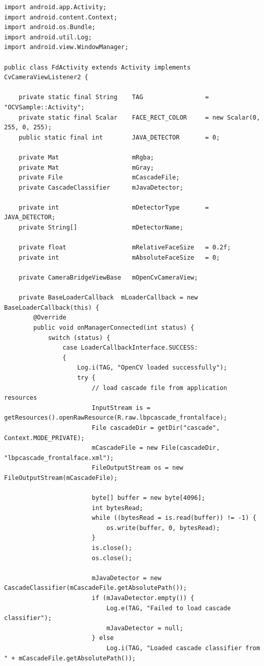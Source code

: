 \documentclass[11pt,a4paper,twoside]{report}
\begin{document}
\begin{appendix}
\begin{tiny}
\begin{flushleft}
\begin{lstlisting}
import android.app.Activity;
import android.content.Context;
import android.os.Bundle;
import android.util.Log;
import android.view.WindowManager;

public class FdActivity extends Activity implements CvCameraViewListener2 {

    private static final String    TAG                 = "OCVSample::Activity";
    private static final Scalar    FACE_RECT_COLOR     = new Scalar(0, 255, 0, 255);
    public static final int        JAVA_DETECTOR       = 0;

    private Mat                    mRgba;
    private Mat                    mGray;
    private File                   mCascadeFile;
    private CascadeClassifier      mJavaDetector;

    private int                    mDetectorType       = JAVA_DETECTOR;
    private String[]               mDetectorName;

    private float                  mRelativeFaceSize   = 0.2f;
    private int                    mAbsoluteFaceSize   = 0;

    private CameraBridgeViewBase   mOpenCvCameraView;

    private BaseLoaderCallback  mLoaderCallback = new BaseLoaderCallback(this) {
        @Override
        public void onManagerConnected(int status) {
            switch (status) {
                case LoaderCallbackInterface.SUCCESS:
                {
                    Log.i(TAG, "OpenCV loaded successfully");
                    try {
                        // load cascade file from application resources
                        InputStream is = getResources().openRawResource(R.raw.lbpcascade_frontalface);
                        File cascadeDir = getDir("cascade", Context.MODE_PRIVATE);
                        mCascadeFile = new File(cascadeDir, "lbpcascade_frontalface.xml");
                        FileOutputStream os = new FileOutputStream(mCascadeFile);

                        byte[] buffer = new byte[4096];
                        int bytesRead;
                        while ((bytesRead = is.read(buffer)) != -1) {
                            os.write(buffer, 0, bytesRead);
                        }
                        is.close();
                        os.close();

                        mJavaDetector = new CascadeClassifier(mCascadeFile.getAbsolutePath());
                        if (mJavaDetector.empty()) {
                            Log.e(TAG, "Failed to load cascade classifier");
                            mJavaDetector = null;
                        } else
                            Log.i(TAG, "Loaded cascade classifier from " + mCascadeFile.getAbsolutePath());



\end{lstlisting}
\end{flushleft}
\end{tiny}
\end{appendix}
\end{document}
